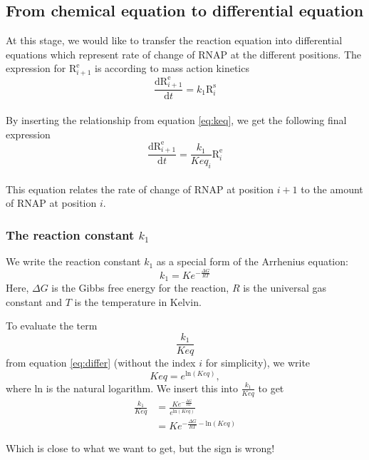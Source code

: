 \documentclass[a4paper]{article}
\newcommand{\te}[1]{\text{#1}}
\newcommand{\diff}[2]{\frac{\mathrm{d} #1}{\mathrm{d} #2}}
\begin{document}
\subsection{From chemical equation to differential equation}
At this stage, we would like to transfer the reaction equation into differential
equations which represent rate of change of RNAP at the different positions.
The expression for $\te{R}_{i+1}^{\te{e}}$ is according to mass action kinetics
\\
\begin{equation*}
	\diff{\te{R}_{i+1}^{\te{e}}}{t} = k_1\te{R}_{i}^{\te{s}}
\end{equation*}
\\
By inserting the relationship from equation \ref{eq:keq}, we get the following
final expression
\\
\begin{equation}
	\diff{\te{R}_{i+1}^{\te{e}}}{t} = \frac{k_1}{Keq_i}\te{R}_{i}^{\te{e}}
	\label{eq:differ}
\end{equation}
\\
This equation relates the rate of change of RNAP at position $i+1$ to the
amount of RNAP at position $i$.

\subsubsection{The reaction constant $k_1$}
We write the reaction constant $k_1$ as a special form of the Arrhenius
equation:
\begin{equation*}
	k_1 = Ke^{-\frac{\Delta G}{RT}}
\end{equation*}
Here, $\Delta G$ is the Gibbs free energy for the reaction, $R$ is the
universal gas constant and $T$ is the temperature in Kelvin.

To evaluate the term
\begin{equation*}
	\frac{k_1}{Keq}
\end{equation*}
from equation \ref{eq:differ} (without the index $i$ for simplicity), we write
\begin{equation*}
	Keq = e^{\te{ln}(Keq)},
\end{equation*}
where ln is the natural logarithm. We insert this into $\frac{k_1}{Keq}$ to get
\begin{align*}
	\frac{k_1}{Keq} &= \frac{Ke^{-\frac{\Delta G}{RT}}}{e^{\te{ln}(Keq)}}\\
	                &= Ke^{-\frac{\Delta G}{RT} - \te{ln}(Keq)}
\end{align*}

Which is close to what we want to get, but the sign is wrong!

\end{document}
